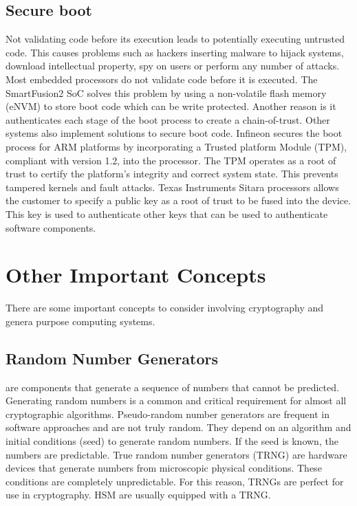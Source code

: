 \subsection*{Secure boot}
Not validating code before its execution leads to potentially executing untrusted code. This causes problems such as hackers inserting malware to hijack systems, download intellectual property, spy on users or perform any number of attacks.
Most embedded processors do not validate code before it is executed. The SmartFusion2 SoC solves this problem by using a non-volatile flash memory (eNVM) to store boot code which can be write protected. Another reason is it authenticates each stage of the boot process to create a chain-of-trust.
Other systems also implement solutions to secure boot code. Infineon secures the boot process for ARM platforms by incorporating a Trusted platform Module (TPM), compliant with version 1.2, into the processor. The TPM operates as a root of trust to certify the platform's integrity and correct system state. This prevents tampered kernels and fault attacks.
Texas Instruments Sitara processors allows the customer to specify a public key as a root of trust to be fused into the device. This key is used to authenticate other keys that can be used to authenticate software components.

\section{Other Important Concepts}\label{chap:background:other}

There are some important concepts to consider involving cryptography and genera purpose computing systems.

\subsection{Random Number Generators} are components that generate a sequence of numbers that cannot be predicted. Generating random numbers is a common and critical requirement for almost all cryptographic algorithms. Pseudo-random number generators are frequent in software approaches and are not truly random. They depend on an algorithm and initial conditions (seed) to generate random numbers. If the seed is known, the numbers are predictable.
True random number generators (TRNG) are hardware devices that generate numbers from microscopic physical conditions. These conditions are completely unpredictable. For this reason, TRNGs are perfect for use in cryptography. HSM are usually equipped with a TRNG.

